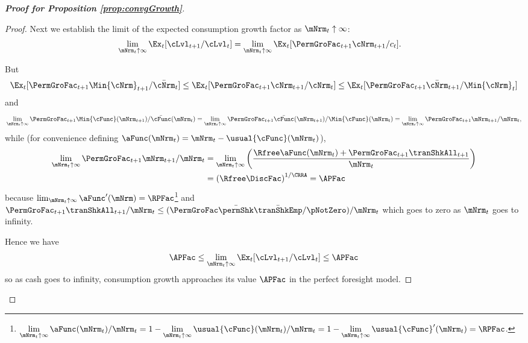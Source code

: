 \documentclass[\econtexRoot/BufferStockTheory]{subfiles}
\begin{document}
\begin{proof}[\textbf{Proof for Proposition \ref{prop:convgGrowth}}]
\begin{proof}


Next we establish the limit of the expected consumption growth factor as $\mNrm_{t} \uparrow \infty$:
\begin{align*}
  \lim_{\mNrm_{t} \uparrow \infty} \Ex_{t}[
  \cLvl_{t+1}/\cLvl_{t}]  & = \lim_{\mNrm_{t} \uparrow \infty} \Ex_{t}[
                            {\PermGroFac}_{t+1} {\cNrm}_{t+1}/c_{t}].
\end{align*}

But
\begin{align*}
  \Ex_{t}[{\PermGroFac}_{t+1} {\Min{\cNrm}}_{t+1}/\bar{\cNrm}_{t}] \leq \Ex_{t}[{\PermGroFac}_{t+1} {\cNrm}_{t+1}/\cNrm_{t}] \leq \Ex_{t}[{\PermGroFac}_{t+1} {\bar{\cNrm}}_{t+1}/\Min{\cNrm}_{t}]
\end{align*}
and
\begin{equation*}  \label{eq:xttoinfty}
  \lim_{\mNrm_t \uparrow \infty} \PermGroFac_{t+1}\Min{\cFunc}(\mNrm_{t+1})/\bar{\cFunc}(\mNrm_t) =
  \lim_{\mNrm_{t} \uparrow \infty} \PermGroFac_{t+1}\bar{\cFunc}(\mNrm_{t+1})/\Min{\cFunc}(\mNrm_t) =
  \lim_{\mNrm_{t} \uparrow \infty}\PermGroFac_{t+1} \mNrm_{t+1}/\mNrm_t,
\end{equation*}
while (for convenience defining $\aFunc(\mNrm_{t})=\mNrm_{t}-\usual{\cFunc}(\mNrm_{t})$), \hypertarget{xtp1toinfty}{}
\begin{align}  \label{eq:xtp1toinfty}
  \lim_{\mNrm_{t} \uparrow \infty} \PermGroFac_{t+1} \mNrm_{t+1}/\mNrm_t  & = \lim_{\mNrm_{t} \uparrow \infty}
                                                                            \left(\frac{\Rfree \aFunc(\mNrm_t)+{\PermGroFac}_{t+1}\tranShkAll_{t+1}}{\mNrm_t}\right)
  \\  & = {(\Rfree \DiscFac)}^{1/\CRRA} = \APFac \notag
\end{align}
because $\lim_{\mNrm_{t}\uparrow \infty} \aFunc^{\prime}(\mNrm)=\RPFac$\footnote{$\displaystyle \lim_{\mNrm_{t}\uparrow \infty} \aFunc(\mNrm_{t})/\mNrm_{t}=1-\lim_{\mNrm_{t}\uparrow \infty} \usual{\cFunc}(\mNrm_{t})/\mNrm_{t}=1-\lim_{\mNrm_{t}\uparrow \infty}\usual{\cFunc}^{\prime}(\mNrm_{t})=\RPFac$.} and $\PermGroFac_{t+1}\tranShkAll_{t+1}/\mNrm_{t} \leq (\PermGroFac \bar{\permShk} \bar{\tranShkEmp}/\pNotZero )/\mNrm_{t}$ which goes to zero as $\mNrm_{t}$ goes to infinity.

Hence we have
\begin{equation*}
  {\APFac}  \leq \lim_{\mNrm_{t} \uparrow \infty} \Ex_{t}[\cLvl_{t+1}/\cLvl_{t}] \leq {\APFac}
\end{equation*}
so as cash goes to infinity, consumption growth approaches its value $\APFac$ in the perfect foresight model.
\end{proof}
\end{proof}
\end{document}
